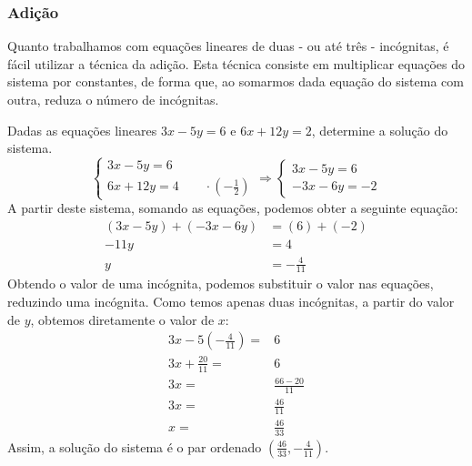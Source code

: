 \subsubsection{Adição}
Quanto trabalhamos com equações lineares de duas - ou até três - incógnitas, é fácil utilizar a técnica da adição. Esta técnica consiste em multiplicar equações do sistema por constantes, de forma que, ao somarmos dada equação do sistema com outra, reduza o número de incógnitas.
\begin{exemplo}
Dadas as equações lineares $3x-5y=6$ e $6x+12y=2$, determine a solução do sistema.
\[\begin{cases}
3x-5y=6 \\
6x+12y=4 \qquad \cdot\left( -\frac{1}{2}\right)
\end{cases} \Rightarrow \begin{cases}
3x-5y=6 \\
-3x -6y = -2
\end{cases}\]
A partir deste sistema, somando as equações, podemos obter a seguinte equação:
\begin{align*}
(3x-5y)+(-3x-6y)&=(6)+(-2) \\ 
-11y&= 4 \\
 y&= -\frac{4}{11}
\end{align*}
Obtendo o valor de uma incógnita, podemos substituir o valor nas equações, reduzindo uma incógnita. Como temos apenas duas incógnitas, a partir do valor de $y$, obtemos diretamente o valor de $x$:
\begin{align*}
3x-5\left(-\frac{4}{11}\right)=&6 \\
3x+\frac{20}{11}=&6 \\
3x=&\frac{66-20}{11}\\
3x=&\frac{46}{11} \\
x=& \frac{46}{33}
\end{align*}
Assim, a solução do sistema é o par ordenado $\left(\frac{46}{33},-\frac{4}{11} \right)$.
\end{exemplo}

